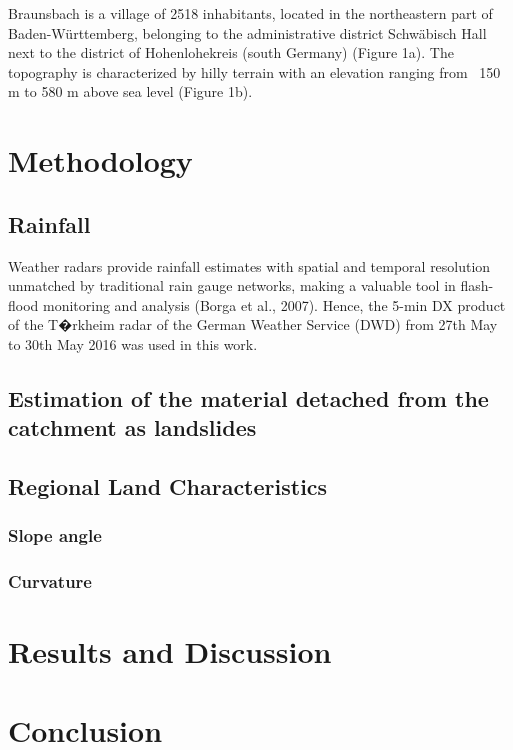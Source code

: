 \documentclass[10pt]{article}
\begin{document}
Braunsbach is a village of 2518 inhabitants, located in the northeastern part of Baden-W{\"u}rttemberg, belonging to the administrative district Schw{\"a}bisch Hall next to the district of Hohenlohekreis (south Germany) (Figure 1a). The topography is characterized by hilly terrain with an elevation ranging from ~150 m to 580 m above sea level (Figure 1b).

\section{Methodology}

\subsection{Rainfall}

Weather radars provide rainfall estimates with spatial and temporal resolution unmatched by traditional rain gauge networks, making a valuable tool in flash-flood monitoring and analysis (Borga et al., 2007). Hence, the 5-min DX product of the T�rkheim radar of the German Weather Service (DWD) from 27th May to 30th May 2016 was used in this work. 

\subsection{Estimation of the material detached from the catchment as landslides}
\subsection{Regional Land Characteristics}
\subsubsection{Slope angle}
\subsubsection{Curvature}

\section{Results and Discussion}

\section{Conclusion}
\end{document}
